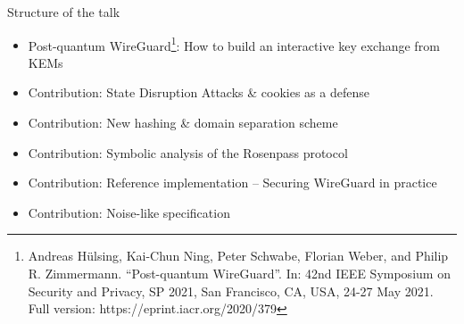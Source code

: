 % 

\begin{frame}{Structure of the talk}
\begin{itemize}
  \item Post-quantum WireGuard\footnote{
	  Andreas Hülsing, Kai-Chun Ning, Peter Schwabe, Florian Weber, and Philip R. Zimmermann. “Post-quantum WireGuard”. In: 42nd IEEE Symposium on Security and Privacy, SP 2021, San Francisco, CA, USA, 24-27 May 2021. Full version: https://eprint.iacr.org/2020/379
	}: How to build an interactive key exchange from KEMs
  \item Contribution: State Disruption Attacks \& cookies as a defense
  \item Contribution: New hashing \& domain separation scheme
  \item Contribution: Symbolic analysis of the Rosenpass protocol
  \item Contribution: Reference implementation – Securing WireGuard in practice
  \item Contribution: Noise-like specification
\end{itemize}
\end{frame}

